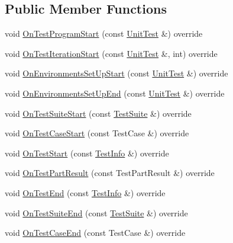 \subsection*{Public Member Functions}
\begin{DoxyCompactItemize}
\item 
void \hyperlink{classtesting_1_1EmptyTestEventListener_ac3f5033fcd82080edb45f546ce9854fe}{On\+Test\+Program\+Start} (const \hyperlink{classtesting_1_1UnitTest}{Unit\+Test} \&) override
\item 
void \hyperlink{classtesting_1_1EmptyTestEventListener_a31edf103561e8b4d747656bc2d927661}{On\+Test\+Iteration\+Start} (const \hyperlink{classtesting_1_1UnitTest}{Unit\+Test} \&, int) override
\item 
void \hyperlink{classtesting_1_1EmptyTestEventListener_a6e498ae763ac8c1a46bd861e0b7ff3f5}{On\+Environments\+Set\+Up\+Start} (const \hyperlink{classtesting_1_1UnitTest}{Unit\+Test} \&) override
\item 
void \hyperlink{classtesting_1_1EmptyTestEventListener_a9b4e781c0b38065a55c2fd163724ba69}{On\+Environments\+Set\+Up\+End} (const \hyperlink{classtesting_1_1UnitTest}{Unit\+Test} \&) override
\item 
void \hyperlink{classtesting_1_1EmptyTestEventListener_a1e32e4bd4857822b6b50e6900aa5c651}{On\+Test\+Suite\+Start} (const \hyperlink{classtesting_1_1TestSuite}{Test\+Suite} \&) override
\item 
void \hyperlink{classtesting_1_1EmptyTestEventListener_a7f9a84967fde01000b7a56e9e84b6052}{On\+Test\+Case\+Start} (const Test\+Case \&) override
\item 
void \hyperlink{classtesting_1_1EmptyTestEventListener_a1d8c7f3f1f92826f668edae1bc5aadf4}{On\+Test\+Start} (const \hyperlink{classtesting_1_1TestInfo}{Test\+Info} \&) override
\item 
void \hyperlink{classtesting_1_1EmptyTestEventListener_ab95992f0a0b3741d59a24c3a7115fa60}{On\+Test\+Part\+Result} (const Test\+Part\+Result \&) override
\item 
void \hyperlink{classtesting_1_1EmptyTestEventListener_a709d7077c086c877d214231bc520ef90}{On\+Test\+End} (const \hyperlink{classtesting_1_1TestInfo}{Test\+Info} \&) override
\item 
void \hyperlink{classtesting_1_1EmptyTestEventListener_aefdb73682d290791461e186d864db718}{On\+Test\+Suite\+End} (const \hyperlink{classtesting_1_1TestSuite}{Test\+Suite} \&) override
\item 
void \hyperlink{classtesting_1_1EmptyTestEventListener_abe05cc74c1081ed51e2c84b73013299e}{On\+Test\+Case\+End} (const Test\+Case \&) override

\end{DoxyCompactItemize}
